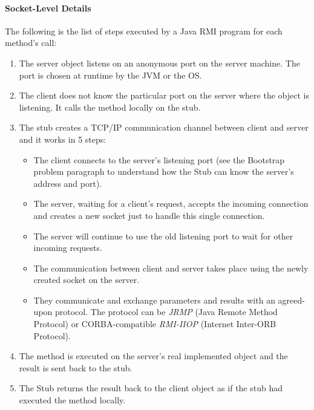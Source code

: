 \paragraph{Socket-Level Details}
\label{SocketLevelDetails}

The following is the list of steps executed by a Java RMI program for each method's call:
\begin{enumerate}
\item The server object listens on an anonymous port on the server machine. The port is chosen at runtime by the JVM or the OS.
\item The client does not know the particular port on the server where the object is listening. It calls the method locally on the stub.
\item The stub creates a TCP/IP communication channel between client and server and it works in 5 steps: 
	\begin{itemize}
	\item The client connects to the server's listening port (see the Bootstrap problem paragraph to understand how the          Stub can know the server's address and port).
	\item The server, waiting for a client's request, accepts the incoming connection and creates a new socket just to 				  handle this single connection.
	\item The server will continue to use the old listening port to wait for other incoming requests.
	\item The communication between client and server takes place using the newly created socket on the server.
	\item They communicate and exchange parameters and results with an agreed-upon protocol. The protocol can be                 \textit{JRMP} (Java Remote Method Protocol) or CORBA-compatible \textit{RMI-IIOP} (Internet Inter-ORB                  Protocol).
	\end{itemize}
\item The method is executed on the server's real implemented object and the result is sent back to the stub.
\item The Stub returns the result back to the client object as if the stub had executed the method locally.
\end{enumerate}

